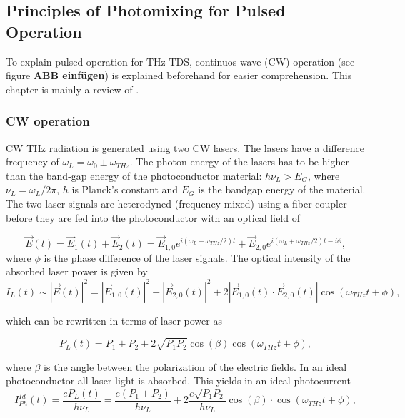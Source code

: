\subsection{Principles of Photomixing for Pulsed Operation}
To explain pulsed operation for THz-TDS, continuos wave (CW) operation (see figure \textbf{ABB einfügen}) is explained beforehand for easier comprehension. This chapter is mainly a review of \cite{nandiErAsInAlGaAsPhotoconductors2021,faridiPulsedFreeSpace2023,preuPrinciplesTHzGeneration2015}.

\subsubsection{CW operation}
CW THz radiation is generated using two CW lasers. The lasers have a difference frequency of $\omega_L = \omega_0 \pm \omega_{THz}$. The photon energy of the lasers has to be higher than the band-gap energy of the photoconductor material: $h\nu_L > E_G$, 
where $\nu_L = \omega_L / 2\pi$, $h$ is Planck’s constant and $E_G$ is the bandgap energy of the material. The two laser signals are heterodyned (frequency mixed) using a fiber coupler before they are fed into the photoconductor with an optical field of

\begin{equation}
	\vec{E}(t) = \vec{E}_1(t) + \vec{E}_2(t) = \vec{E}_{1,0}e^{i(\omega_L - \omega_{THz}/2)t} + \vec{E}_{2,0}e^{i(\omega_L + \omega_{THz}/2)t - i\phi},
\end{equation}
where $\phi$ is the phase difference of the laser signals. The optical intensity of the absorbed laser power is given by 
\begin{equation}
	I_L(t) \sim |\vec{E}(t)|^2 = |\vec{E}_{1,0}(t)|^2 + |\vec{E}_{2,0}(t)|^2 + 2|\vec{E}_{1,0}(t) \cdot \vec{E}_{2,0}(t)|\cos(\omega_{THz}t + \phi), 
\end{equation}

which can be rewritten in terms of laser power as 

\begin{equation}
	P_L(t) = P_1 + P_2 + 2\sqrt{P_1 P_2}\cos(\beta)\cos(\omega_{THz}t + \phi), 
\end{equation}

where $\beta$ is the angle between the polarization of the electric fields. In an ideal photoconductor all laser light is absorbed. This yields in an ideal photocurrent 
\begin{equation}
	I_{Ph}^{Id}(t) = \frac{eP_L(t)}{h\nu_L} = \frac{e(P_1+P_2)}{h\nu_L} + 2\frac{e\sqrt{P_1P_2}}{h\nu_L}\cos(\beta)\cdot\cos(\omega_{THz}t + \phi),
	\label{eq_iph}
\end{equation}


